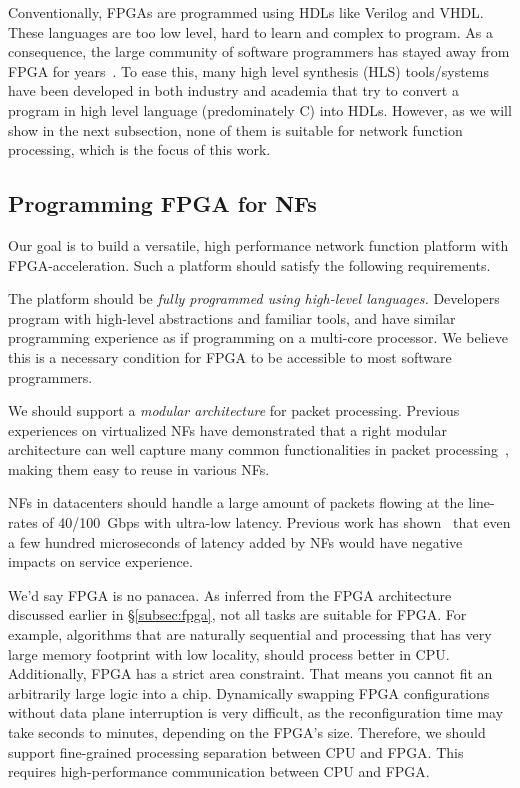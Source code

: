 Conventionally, FPGAs are programmed using HDLs like Verilog and VHDL.
These languages are too low level, hard to learn and complex to program.
As a consequence, the large community of software programmers has stayed away from FPGA for years~\cite{bacon2013fpga}. 
To ease this, many high level synthesis (HLS) 
tools/systems have been developed in
both industry and academia that try to convert a program in high level
language (predominately C) into HDLs. 
However, as we will show in the next subsection, none of them is 
suitable for network function processing, which is the focus of this work.


\subsection{Programming FPGA for NFs}

Our goal is to build a versatile, high performance network function 
platform with FPGA-acceleration. Such a platform should satisfy 
the following requirements.

 The platform should be 
\textit{fully programmed using high-level languages.} 
Developers program with high-level abstractions and familiar tools, and
have similar programming experience as if programming on a multi-core processor.
We believe this is a necessary condition for FPGA to be accessible to
most software programmers.

 We should support a \textit{modular architecture}
for packet processing. Previous experiences on virtualized NFs
have demonstrated that a right modular architecture can well capture many common 
functionalities in packet processing~\cite{kohler2000click,martins2014clickos},
making them easy to reuse in various NFs.

 NFs in datacenters
should handle a large amount of packets flowing at the line-rates of 40/100~Gbps
with ultra-low latency. Previous work has shown~\cite{rollback-mb} that even a few
hundred microseconds of latency added by NFs would have 
negative impacts on service experience.

 We'd say FPGA is no panacea. 
As inferred from the FPGA architecture discussed earlier in \S\ref{subsec:fpga}, not all tasks are 
suitable for FPGA. For example, algorithms that are naturally sequential and
processing that has very large memory footprint with low locality, should process  
better in CPU.
Additionally, FPGA has a strict area constraint. 
That means you cannot fit an arbitrarily large logic into a chip.
Dynamically swapping FPGA configurations without data plane interruption
is very difficult, as the reconfiguration time may take
seconds to minutes, depending on the FPGA's size.
%
Therefore, we should support fine-grained processing 
separation between CPU and FPGA. This requires high-performance communication 
between CPU and FPGA.


